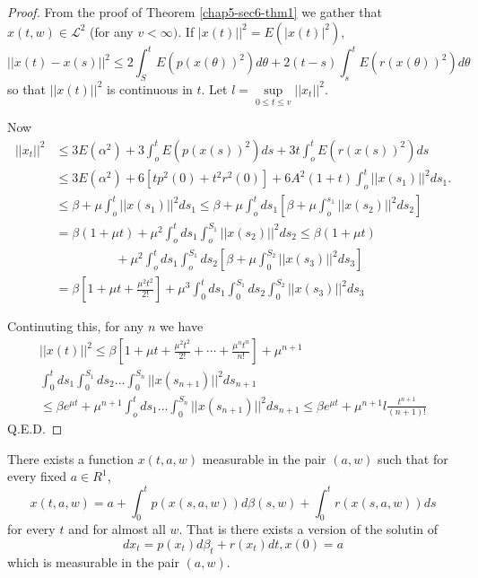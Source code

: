 \begin{proof}
From the proof of Theorem \ref{chap5-sec6-thm1} we gather that $x(t, w) \in
\mathcal{L}^2$ (for any $v < \infty)$. If $\mid x(t)||^2 = E (\mid
x(t)|^2)$, 
$$
||x(t) -x (s)||^2  \leq 2 \int^t_S E(p(x(\theta))^2)d\theta + 2 (t-s)
\int^t_s E (r(x(\theta))^2)d\theta 
$$ 
so that $|| x(t)||^2$ is continuous in $t$. Let $l= \sup\limits_{0
\leq t \leq v} || x_t||^2$. 

Now
\begin{align*}
||x_t||^2 &\leq 3E (\alpha^2 ) +3 \int^t_o E (p(x(s))^2) ds + 3t
\int^t_o E (r(x(s))^2)ds\\ 
&\leq 3E (\alpha^2 ) +6 [tp^2 (0) + t^2 r^2(0)] + 6A^2 (1+t)
\int^t_o ||x(s_1)||^2 ds_1.\\ 
&\leq \beta + \mu \int^t_o || x (s_1) ||^2 ds_1 \leq \beta + \mu
\int^t_o ds_1 [\beta + \mu \int^{s_1}_o|| x(s_2)||^2 ds_2] \\
&=\beta (1+ \mu t) + \mu^2 \int^t_o ds_1\int ^{S_1}_o ||x (s_2)||^2
ds_2 \leq \beta (1 + \mu t)\\ 
& \hspace{2cm} + \mu^2 \int^t_o ds_1 \int^{S_1}_o
ds_2 \left[\beta +\mu \int^{S_2}_0 ||x(s_3) ||^2 ds_3\right]\\ 
&=\beta \left[1+ \mu t + \frac{\mu^2 t^2}{2!}\right] + \mu^3 \int^t_0 ds_1
\int^{S_1}_0 ds_2 \int^{S_2}_0 || x(s_3) ||^2 ds_3 
\end{align*}\pageoriginale

Continuting this, for any $n$ we have
\begin{multline*}
  ||x(t)||^2 \leq \beta \left[1+ \mu t + \frac{\mu^2 t^2}{2!} + \cdots +
    \frac{\mu^n t^n}{n!}\right] + \mu^{n+1} \\
  \int^t_0 ds_1 \int^{S_1}_0  ds_2
  \dots \int^{S_n}_0 ||x(s_{n+1})||^2 ds_{n+1}\\ 
  \leq \beta e^{\mu t} + \mu^{n+1} \int^t_o ds_1 \ldots \int^{S_n}_0
  ||x(s_{n+1})||^2 ds_{n+1} \leq \beta e^{\mu t} + \mu^{n+1} l
  \frac{t^{n+1}}{(n+1)!} 
\end{multline*}
Q.E.D.
\end{proof}

\begin{thm}\label{chap5-sec6-thm2}%
There exists a function $x(t, a, w)$ measurable in the pair $(a, w)$
such that for every fixed $a \in R^1$, 
$$
x(t, a, w) = a + \int^t_0 p(x(s, a, w))d \beta (s, w) + \int^t_0
r(x(s, a, w)) ds 
$$
for every $t $ and for almost all $w$. That is there exists a
version of the solutin of  
$$
dx_t = p (x_t) d \beta_t + r(x_t)dt, x(0) = a
$$
which is measurable in the pair $(a,w)$.
\end{thm}

